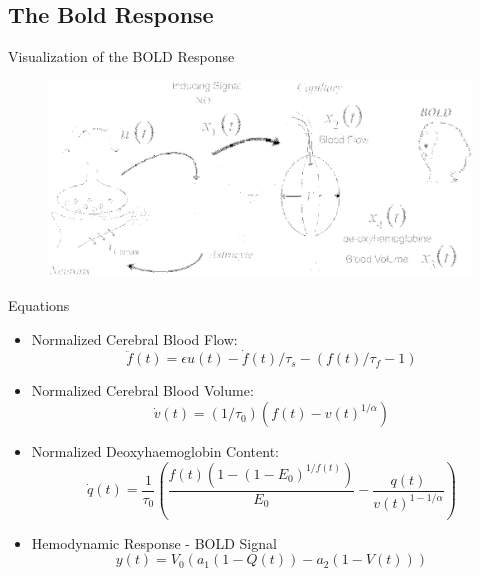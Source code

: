 \documentclass{beamer}
\begin{document}
\subsection{The Bold Response}
\begin{frame}{Visualization of the BOLD Response}
\begin{figure}
\includegraphics[scale=.23]{model}
\caption{
    \tiny
    \cite{ISI:000189252300007}
}
\end{figure}
\end{frame}

\begin{frame}{Equations}
  \begin{itemize}
    \item Normalized Cerebral Blood Flow:
    $$\ddot{f}(t) = \epsilon u(t) - \dot{f}(t)/\tau_s - (f(t)/\tau_f - 1)$$
    \item Normalized Cerebral Blood Volume:
    $$\dot{v}(t) = (1/\tau_0)( f(t) - v(t) ^ {1/\alpha}) $$
    \item Normalized Deoxyhaemoglobin Content:
    $$\dot{q}(t) = \frac{1}{\tau_0}\left(\frac{f(t)(1- (1-E_0)^{1/f(t)})}{E_0} - 
            \frac{q(t)}{v(t)^{1-1/\alpha}}\right)$$
    \item Hemodynamic Response - BOLD Signal
    $$y(t) = V_0(a_1( 1 - Q(t)) - a_2(1 - V(t)))$$
  \end{itemize}
\end{frame}
\end{document}
